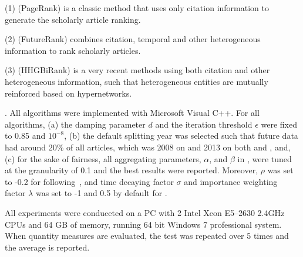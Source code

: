 \noindent
(1) \pagerank (PageRank) is a classic method that uses only citation information to generate the scholarly article ranking.


\noindent
(2) \futurerank (FutureRank) combines citation, temporal and other heterogeneous information to rank scholarly articles.

\noindent
(3) \hhgrank (HHGBiRank) is a very recent methods using both citation and other heterogeneous information, such that heterogeneous entities are mutually reinforced based on hypernetworks.


.
All algorithms were implemented with Microsoft Visual C++.
For all algorithms, (a) the damping parameter $d$ and the iteration threshold $\epsilon$ were fixed to 0.85 and $10^{-8}$,
(b) the default splitting year was selected such that future data had around 20\% of all articles, which was 2008 on \aan and 2013 on both \aminer and \magdata, and,
(c) for the sake of fairness, all aggregating parameters, \eg $\alpha$, and $\beta$ in \ensemblerank, were tuned at the granularity of 0.1 and the best results were reported.
%
Moreover, $\rho$ was set to -0.2 for \futurerank following~\cite{sayyadi09}, and time decaying factor $\sigma$ and importance weighting factor $\lambda$ was set to -1 and 0.5  by default for \ensemblerank.

All experiments were conduceted on a PC with 2 Intel Xeon E5--2630 2.4GHz CPUs and 64 GB of memory, running 64 bit Windows 7 professional system. %
When quantity measures are evaluated, the test was repeated over 5 times and the average is reported.



